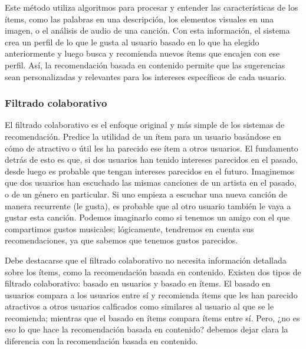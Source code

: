  Este método utiliza algoritmos para procesar y entender las características de los ítems, como las palabras en una descripción, los elementos 
 visuales en una imagen, o el análisis de audio de una canción. Con esta información, el sistema crea un perfil de lo que le gusta al usuario basado en 
 lo que ha elegido anteriormente y luego busca y recomienda nuevos ítems que encajen con ese perfil. Así, la recomendación basada en contenido permite que las sugerencias sean 
 personalizadas y relevantes para los intereses específicos de cada usuario.


\subsubsection{Filtrado colaborativo\label{SEC:RECOMENDADORES_COLABORATIVOS}}

El filtrado colaborativo es el enfoque original y más simple de los sistemas de recomendación. Predice la utilidad de un ítem para un usuario basándose en
cómo de atractivo o útil les ha parecido ese ítem a otros usuarios. El fundamento detrás de esto es que, si dos usuarios han tenido intereses parecidos en el
pasado, desde luego es probable que tengan intereses parecidos en el futuro. Imaginemos que dos usuarios han escuchado las mismas canciones de un artista
en el pasado, o de un género en particular. Si uno empieza a escuchar una nueva canción de manera recurrente (le gusta), es probable que al otro usuario
también le vaya a gustar esta canción. Podemos imaginarlo como si tenemos un amigo con el que compartimos gustos musicales; lógicamente, tendremos en cuenta 
sus recomendaciones, ya que sabemos que tenemos gustos parecidos.

Debe destacarse que el filtrado colaborativo no necesita información detallada sobre los ítems, como la recomendación basada en contenido. Existen dos tipos
de filtrado colaborativo: basado en usuarios y basado en ítems. El basado en usuarios compara a los usuarios entre sí y recomienda ítems que les han parecido
atractivos a otros usuarios calficados como similares al usuario al que se le recomienda; mientras que el basado en ítems compara
ítems entre sí. Pero, ¿no es eso lo que hace la recomendación basada en contenido? debemos dejar clara la diferencia con la recomendación basada en contenido.


